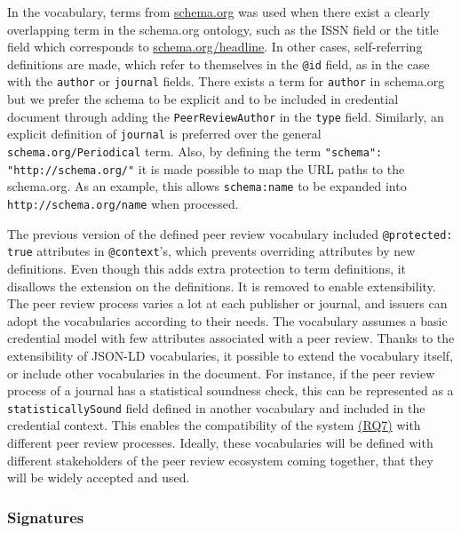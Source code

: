 In the vocabulary, terms from \url{schema.org} was used when there exist a clearly overlapping term in the schema.org ontology, such as the \acrshort{ISSN} field or the title field which corresponds to \url{schema.org/headline}. In other cases, self-referring definitions are made, which refer to themselves in the \lstinline{@id} field, as in the case with the \lstinline{author} or \lstinline{journal} fields. There exists a term for \lstinline{author} in schema.org but we prefer the schema to be explicit and to be included in credential document through adding the \lstinline{PeerReviewAuthor} in the \lstinline{type} field. Similarly, an explicit definition of \lstinline{journal} is preferred over the general \lstinline{schema.org/Periodical} term. Also, by defining the term \lstinline{"schema": "http://schema.org/"} it is made possible to map the \acrshort{URL} paths to the schema.org. As an example, this allows \lstinline{schema:name} to be expanded into \lstinline{http://schema.org/name} when processed. 

The previous version of the defined peer review vocabulary included \lstinline{@protected: true} attributes in \lstinline{@context}'s, which prevents overriding attributes by new definitions. Even though this adds extra protection to term definitions, it disallows the extension on the definitions. It is removed to enable extensibility. The peer review process varies a lot at each publisher or journal, and issuers can adopt the vocabularies according to their needs. The vocabulary assumes a basic credential model with few attributes associated with a peer review. Thanks to the extensibility of \acrshort{JSON-LD} vocabularies, it possible to extend the vocabulary itself, or include other vocabularies in the document. For instance, if the peer review process of a journal has a statistical soundness check, this can be represented as a \lstinline{statisticallySound} field defined in another vocabulary and included in the credential context. This enables the compatibility of the system \hyperref[rq:compatible]{(RQ7)} with different peer review processes.  Ideally, these vocabularies will be defined with different stakeholders of the peer review ecosystem coming together, that they will be widely accepted and used.


\subsubsection{Signatures}

